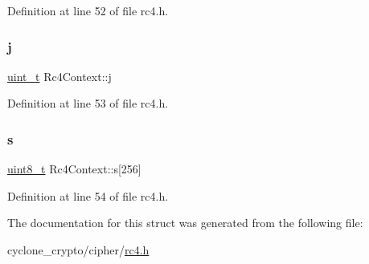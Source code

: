 Definition at line 52 of file rc4.\+h.

\mbox{\label{structRc4Context_a359e55af999b348d23a63790177e2e0b}} 
\subsubsection{\texorpdfstring{j}{j}}
{\footnotesize\ttfamily \hyperlink{compiler__port_8h_a12a1e9b3ce141648783a82445d02b58d}{uint\+\_\+t} Rc4\+Context\+::j}



Definition at line 53 of file rc4.\+h.

\mbox{\label{structRc4Context_a4c824dd771819d672000dedd6f2a3d9d}} 
\subsubsection{\texorpdfstring{s}{s}}
{\footnotesize\ttfamily \hyperlink{stdint_8h_aba7bc1797add20fe3efdf37ced1182c5}{uint8\+\_\+t} Rc4\+Context\+::s\mbox{[}256\mbox{]}}



Definition at line 54 of file rc4.\+h.



The documentation for this struct was generated from the following file\+:\begin{DoxyCompactItemize}
\item 
cyclone\+\_\+crypto/cipher/\hyperlink{rc4_8h}{rc4.\+h}\end{DoxyCompactItemize}
